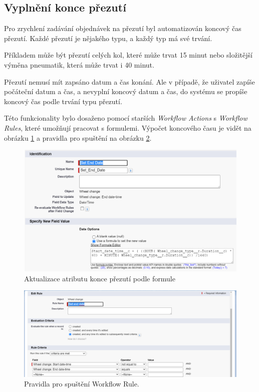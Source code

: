 \subsection{Vyplnění konce přezutí}
Pro zrychlení zadávání objednávek na přezutí byl automatizován koncový čas přezutí. Každé přezutí je nějakého typu, a každý typ má své trvání.

Příkladem může být přezutí celých kol, které může trvat 15 minut nebo složitější výměna pneumatik, která může trvat i 40 minut.

Přezutí nemusí mít zapsáno datum a čas konání. Ale v případě, že uživatel zapíše počáteční datum a čas, a nevyplní koncový datum a čas, do systému se propíše koncový čas podle trvání typu přezutí.

Této funkcionality bylo dosaženo pomocí starších \emph{Workflow Actions} s \emph{Workflow Rules}, které umožňují pracovat s formulemi.
Výpočet koncového času je vidět na obrázku \ref{fig:wheel_chage_autofill_date} a pravidla pro spuštění na obrázku \ref{fig:wheel_chage_autofill_date_rules}.
\begin{figure}[h!]
    \centering
    \includegraphics[width=\textwidth]{assets/7_implementace/automatizace/Wheel change end date Workflow Field Update.png}
    \caption{Aktualizace atributu konce přezutí podle formule}
    \label{fig:wheel_chage_autofill_date}
\end{figure}
\begin{figure}[h!]
    \centering
    \includegraphics[width=\textwidth]{assets/7_implementace/automatizace/Workflow Rule.png}
    \caption{Pravidla pro spuštění Workflow Rule.}
    \label{fig:wheel_chage_autofill_date_rules}
\end{figure}
\FloatBarrier
